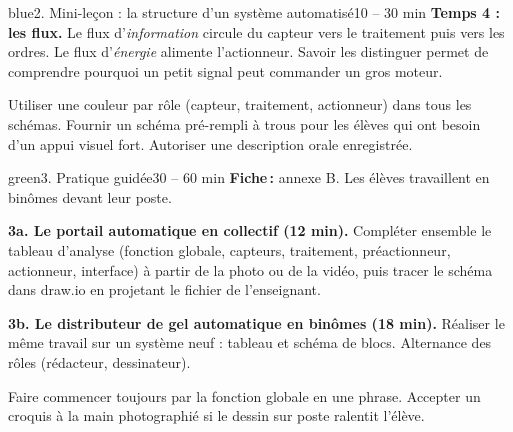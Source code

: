 \documentclass[11pt,a4paper]{article}
\begin{document}
\begin{etape}{blue}{2. Mini-leçon : la structure d'un système automatisé}{10 -- 30 min}
\textbf{Temps 4 : les flux.} Le flux d'\emph{information} circule du capteur vers le traitement puis vers les ordres. Le flux d'\emph{énergie} alimente l'actionneur. Savoir les distinguer permet de comprendre pourquoi un petit signal peut commander un gros moteur.

\begin{astuce}
Utiliser une couleur par rôle (capteur, traitement, actionneur) dans tous les schémas. Fournir un schéma pré-rempli à trous pour les élèves qui ont besoin d'un appui visuel fort. Autoriser une description orale enregistrée.
\end{astuce}
\end{etape}

\begin{etape}{green}{3. Pratique guidée}{30 -- 60 min}
\textbf{Fiche\,:} annexe B. Les élèves travaillent en binômes devant leur poste.

\textbf{3a. Le portail automatique en collectif (12 min).} Compléter ensemble le tableau d'analyse (fonction globale, capteurs, traitement, préactionneur, actionneur, interface) à partir de la photo ou de la vidéo, puis tracer le schéma dans draw.io en projetant le fichier de l'enseignant.

\textbf{3b. Le distributeur de gel automatique en binômes (18 min).} Réaliser le même travail sur un système neuf : tableau et schéma de blocs. Alternance des rôles (rédacteur, dessinateur).


\begin{astuce}
Faire commencer toujours par la fonction globale en une phrase. Accepter un croquis à la main photographié si le dessin sur poste ralentit l'élève.
\end{astuce}
\end{etape}
\end{document}
